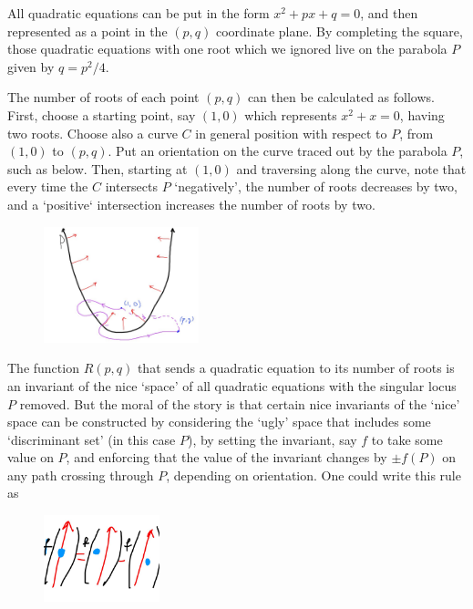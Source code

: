 \begin{example}
        All quadratic equations can be put in the form \(x^{2} + px + q = 0\), and then represented as a point in the \((p, q)\) coordinate plane. By completing the square, those quadratic equations with one root which we ignored live on the parabola \(P\) given by \(q = p^{2}/4\).

        The number of roots of each point \((p, q)\) can then be calculated as follows. First, choose a starting point, say \((1, 0)\) which represents \(x^{2} + x = 0\), having two roots. Choose also a curve \(C\) in general position with respect to \(P\), from \((1, 0)\) to \((p, q)\). Put an orientation on the curve traced out by the parabola \(P\), such as below. Then, starting at \((1, 0)\) and traversing along the curve, note that every time the \(C\) intersects \(P\) `negatively', the number of roots decreases by two, and a `positive` intersection increases the number of roots by two.

        \begin{figure}[H]
                \centering
                \includegraphics[width=0.4\textwidth]{graphics/parabola_example.jpg}
        \end{figure}

        The function \(R(p, q)\) that sends a quadratic equation to its number of roots is an invariant of the nice `space' of all quadratic equations with the singular locus \(P\) removed. But the moral of the story is that certain nice invariants of the `nice' space can be constructed by considering the `ugly' space that includes some `discriminant set' (in this case \(P\)), by setting the invariant, say \(f\) to take some value on \(P\), and enforcing that the value of the invariant changes by \(\pm f(P)\) on any path crossing through \(P\), depending on orientation. One could write this rule as

\begin{figure}[H]
        \centering
        \includegraphics[width=0.3\textwidth]{graphics/simple_singularity_relation.jpg}
\end{figure}
\end{example}



